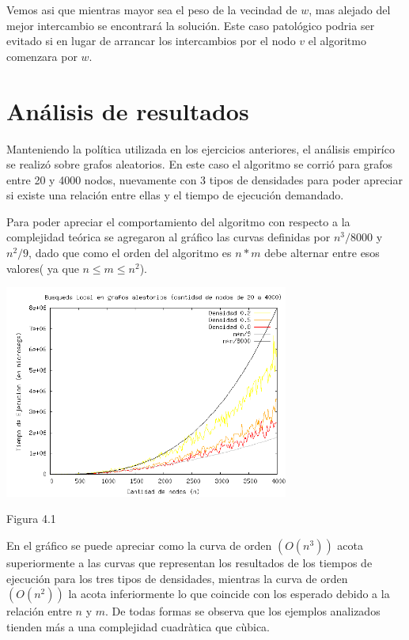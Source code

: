 \documentclass[a4paper,11pt] {article}
\begin{document}
Vemos asi que mientras mayor sea el peso de la vecindad de $w$, mas alejado del mejor intercambio se encontrar\'a la soluci\'on. Este caso patol\'ogico podria ser evitado si en lugar de arrancar los intercambios por el nodo $v$ el algoritmo comenzara por $w$.

\section*{An\'alisis de resultados}

Manteniendo la política utilizada en los ejercicios anteriores, el análisis empiríco se realizó sobre grafos aleatorios. En este caso el algoritmo se corrió para grafos entre 20 y 4000 nodos, nuevamente con 3 tipos de densidades
para poder apreciar si existe una relación entre ellas y el tiempo de ejecución demandado.

Para poder apreciar el comportamiento del algoritmo con respecto a la complejidad teórica se agregaron al gráfico las curvas definidas por $n^3/8000$ y $n^2/9$, dado que como el orden del algoritmo es $n * m$ debe alternar entre esos valores( ya que $n \leq m \leq n^2$).

\begin{center}
 \includegraphics[width=0.7\textwidth]{graficos/tiemposBL.png}
\begin{center}
Figura 4.1
\end{center}
\end{center}

En el gráfico se puede apreciar como la curva de orden $(O(n^3))$ acota superiormente a las curvas que representan los resultados de los tiempos de ejecución para los tres tipos de densidades, mientras la curva de orden $(O(n^2))$ la acota inferiormente lo que coincide con los esperado debido a la relación entre $n$ y $m$. De todas formas se observa que los ejemplos analizados tienden más a una complejidad cuadràtica que cùbica.
\end{document}
